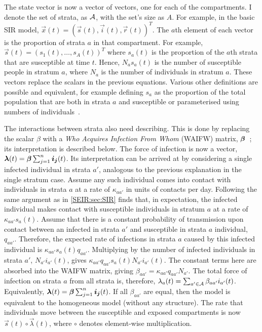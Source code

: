 \documentclass[thesis.tex]{subfiles}
\begin{document}
The state vector is now a vector of vectors, one for each of the compartments.
I denote the set of strata, as $\mathcal{A}$, with the set's size as $A$.
For example, in the basic SIR model, $\vec{x}(t) = (\vec{s}(t), \vec{i}(t), \vec{r}(t))^T$.
The $a$th element of each vector is the proportion of strata $a$ in that compartment.
For example, $\vec{s}(t) = (s_1(t), \dots, s_A(t))^T$ where $s_a(t)$ is the proportion of the $a$th strata that are susceptible at time $t$.
Hence, $N_a s_a(t)$ is the number of susceptible people in stratum $a$, where $N_a$ is the number of individuals in stratum $a$.
These vectors replace the scalars in the previous equations.
Various other definitions are possible and equivalent, for example defining $s_a$ as the proportion of the total population that are both in strata $a$ and susceptible or parameterised using numbers of individuals~\autocite[57]{keelingModeling}.

The interactions between strata also need describing.
This is done by replacing the scalar $\beta$ with a \emph{Who Acquires Infection From Whom} (WAIFW) matrix, $\bm{\beta}$~\autocite[58]{keelingModeling}; its interpretation is described below.
The force of infection is now a vector, $\bm\lambda(t) = \bm{\beta} \sum_{j=1}^n \bm{i_j}(t)$.
Its interpretation can be arrived at by considering a single infected individual in strata $a'$, analogous to the previous explanation in the single stratum case.
Assume any such individual comes into contact with individuals in strata $a$ at a rate of $\kappa_{aa'}$ in units of contacts per day.
Following the same argument as in \cref{SEIR:sec:SIR} finds that, in expectation, the infected individual makes contact with susceptible individuals in stratum $a$ at a rate of $\kappa_{aa'} s_a(t)$.
Assume that there is a constant probability of transmission upon contact between an infected in strata $a'$ and susceptible in strata $a$ individual, $q_{aa'}$.
Therefore, the expected rate of infections in strata $a$ caused by this infected individual is $\kappa_{aa'} s_a(t) q_{aa'}$.
Multiplying by the number of infected individuals in strata $a'$, $N_{a'} i_{a'}(t)$, gives $\kappa_{aa'} q_{aa'} s_a(t) N_{a'} i_{a'}(t)$.
The constant terms here are absorbed into the WAIFW matrix, giving $\beta_{aa'} = \kappa_{aa'} q_{aa'} N_{a'}$.
The total force of infection on strata $a$ from all strata is, therefore, $\lambda_a(t) = \sum_{a' \in \mathcal{A}} \beta_{aa'} i_{a'}(t)$.
Equivalently, $\bm\lambda(t) = \bm{\beta} \sum_{j=1}^n \bm{i_j}(t)$.
If all $\beta_{aa'}$ are equal, then the model is equivalent to the homogeneous model (\ie without any structure).
The rate that individuals move between the susceptible and exposed compartments is now $\vec{s}(t) \circ \vec\lambda(t)$, where $\circ$ denotes element-wise multiplication.
\end{document}
